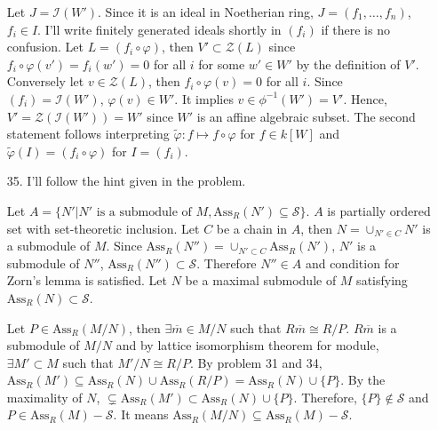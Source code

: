 \documentclass[12pt]{article}
\newcommand{\Ass}{\text{Ass}_R}
\newcommand{\I}{\mathcal{I}}
\newcommand{\Z}{\mathcal{Z}}
\begin{document}
\begin{enumerate}
Let $J=\I(W')$. Since it is an ideal in Noetherian ring, $J=(f_1, \ldots, f_n)$, $f_i\in I$. I'll write finitely generated ideals shortly in $(f_i)$ if there is no confusion. Let $L=(f_i\circ \varphi)$, then $V'\subset \Z(L)$ since $f_i\circ\varphi(v')=f_i(w')=0$ for all $i$ for some $w'\in W'$ by the definition of $V'$. Conversely let $v\in \Z(L)$, then $f_i\circ\varphi(v)=0$ for all $i$. Since $(f_i)=\I(W')$, $\varphi(v)\in W'$. It implies $v\in \phi^{-1}(W')=V'$. Hence, $V'=\Z\left(\I(W')\right)=W'$ since $W'$ is an affine algebraic subset. The second statement follows interpreting $\tilde{\varphi}:f\mapsto f\circ \varphi$ for $f\in k[W]$ and $\tilde{\varphi}(I)=(f_i\circ \varphi)$ for $I=(f_i)$.
\item[35.] I'll follow the hint given in the problem.

Let $A=\{N'|N'\text{ is a submodule of }M,\text{Ass}_R(N')\subseteq \mathcal{S}\}$. $A$ is partially ordered set with set-theoretic inclusion. Let $C$ be a chain in $A$, then $N=\cup_{N'\in C}N'$ is a submodule of $M$. Since $\Ass(N'')=\cup_{N'\subset C}\Ass(N')$, $N'$ is a submodule of $N''$, $\Ass(N'')\subset \mathcal{S}$. Therefore $N''\in A$ and condition for Zorn's lemma is satisfied. Let $N$ be a maximal submodule of $M$ satisfying $\Ass(N)\subset \mathcal{S}$.

Let $P\in \Ass(M/N)$, then $\exists \overline{m}\in M/N$ such that $R\overline{m}\cong R/P$. $R\overline{m}$ is a submodule of $M/N$ and by lattice isomorphism theorem for module, $\exists M'\subset M$ such that $M'/N\cong R/P$. By problem 31 and 34, $\Ass(M')\subseteq \Ass(N)\cup \Ass(R/P)=\Ass(N)\cup \{P\}$. By the maximality of $N$, $\subsetneq\Ass(M')\subset \Ass(N)\cup \{P\}$. Therefore, $\{P\}\notin \mathcal{S}$ and $P\in \Ass(M)-\mathcal{S}$. It means $\Ass(M/N)\subseteq \Ass(M)-\mathcal{S}$.


\end{enumerate}
\end{document}
